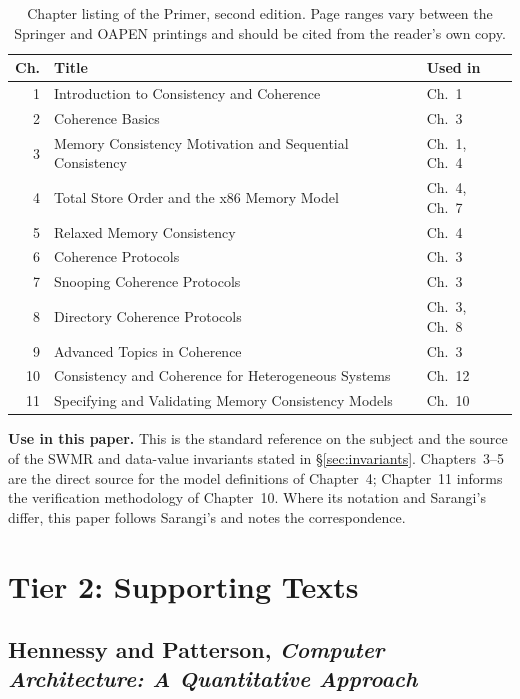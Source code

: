 \begin{table}[H]
\centering
\small
\begin{tabular}{@{}rp{8.2cm}l@{}}
\toprule
\textbf{Ch.} & \textbf{Title} & \textbf{Used in} \\
\midrule
1  & Introduction to Consistency and Coherence            & Ch.~1 \\
2  & Coherence Basics                                     & Ch.~3 \\
3  & Memory Consistency Motivation and Sequential Consistency & Ch.~1, Ch.~4 \\
4  & Total Store Order and the x86 Memory Model           & Ch.~4, Ch.~7 \\
5  & Relaxed Memory Consistency                           & Ch.~4 \\
6  & Coherence Protocols                                  & Ch.~3 \\
7  & Snooping Coherence Protocols                         & Ch.~3 \\
8  & Directory Coherence Protocols                        & Ch.~3, Ch.~8 \\
9  & Advanced Topics in Coherence                         & Ch.~3 \\
10 & Consistency and Coherence for Heterogeneous Systems  & Ch.~12 \\
11 & Specifying and Validating Memory Consistency Models  & Ch.~10 \\
\bottomrule
\end{tabular}
\caption{Chapter listing of the Primer, second edition. Page ranges vary between
the Springer and OAPEN printings and should be cited from the reader's own copy.}
\label{tab:toc-primer}
\end{table}

\noindent \textbf{Use in this paper.} This is the standard reference on the
subject and the source of the SWMR and data-value invariants stated in
\S\ref{sec:invariants}. Chapters~3--5 are the direct source for the model
definitions of Chapter~4; Chapter~11 informs the verification methodology of
Chapter~10.
Where its notation and Sarangi's differ, this paper follows Sarangi's
and notes the correspondence.

\section{Tier 2: Supporting Texts}

\subsection{Hennessy and Patterson, \emph{Computer Architecture: A Quantitative
Approach}}


